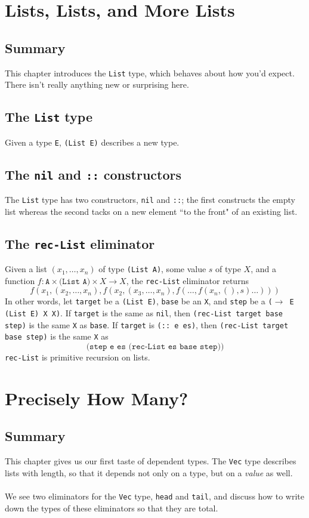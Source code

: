 \documentclass{article}
\newcommand{\ttt}[1]{\texttt{#1}}
\begin{document}
\section{Lists, Lists, and More Lists}
\subsection{Summary}
This chapter introduces the \ttt{List} type, which behaves about how you'd expect. There isn't really anything new or surprising here.
\subsection{The \ttt{List} type}
Given a type \ttt{E}, \ttt{(List E)} describes a new type.
\subsection{The \ttt{nil} and \ttt{::} constructors}
The \ttt{List} type has two constructors, \ttt{nil} and \ttt{::}; the first constructs the empty list whereas the second tacks on a new element ``to the front" of an existing list.
\subsection{The \ttt{rec-List} eliminator}
Given a list \((x_1, \dots, x_n)\) of type \ttt{(List A)}, some value \(s\) of type \(X\), and a function \(f : \ttt{A} \times \ttt{(List A)} \times X \to X\), the \ttt{rec-List} eliminator returns \[
    f(x_1, (x_2, \dots, x_n), f(x_2, (x_3, \dots, x_n), f(\dots, f(x_n, (), s) \dots)))
\]
In other words, let \ttt{target} be a \ttt{(List E)}, \ttt{base} be an \ttt{X}, and \ttt{step} be a \ttt{(\(\to\) E (List E) X X)}. If \ttt{target} is the same as \ttt{nil}, then \ttt{(rec-List target base step)} is the same \ttt{X} as \ttt{base}. If \ttt{target} is \ttt{(:: e es)}, then \ttt{(rec-List target base step)} is the same \ttt{X} as \[
    \ttt{(step e es (rec-List es base step))}
\]
\ttt{rec-List} is primitive recursion on lists. 
\section{Precisely How Many?}
\subsection{Summary}
This chapter gives us our first taste of dependent types. The \ttt{Vec} type describes lists with length, so that it depends not only on a type, but on a \textit{value} as well.
\\ \\
We see two eliminators for the \ttt{Vec} type, \ttt{head} and \ttt{tail}, and discuss how to write down the types of these eliminators so that they are total.
\end{document}

